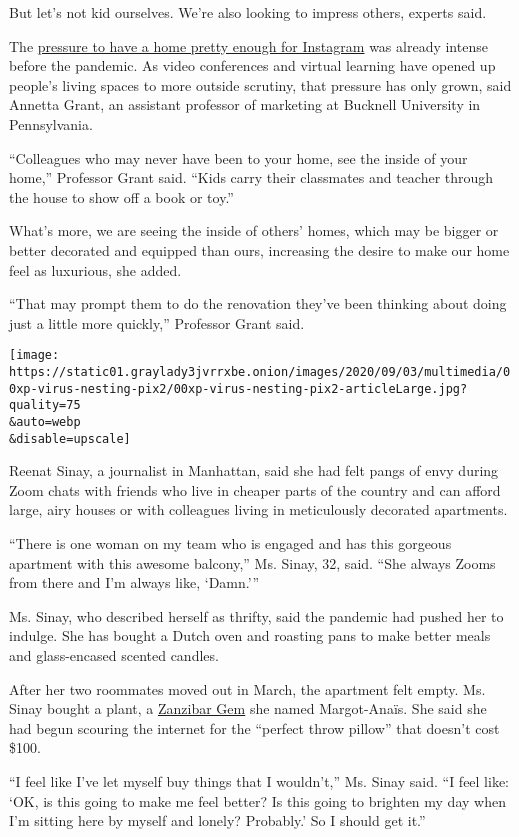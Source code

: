 But let's not kid ourselves. We're also looking to impress others,
experts said.

The
\href{https://www.idealhome.co.uk/news/how-instagram-makes-us-feel-about-homes-208263}{pressure
to have a home pretty enough for Instagram} was already intense before
the pandemic. As video conferences and virtual learning have opened up
people's living spaces to more outside scrutiny, that pressure has only
grown, said Annetta Grant, an assistant professor of marketing at
Bucknell University in Pennsylvania.

``Colleagues who may never have been to your home, see the inside of
your home,'' Professor Grant said. ``Kids carry their classmates and
teacher through the house to show off a book or toy.''

What's more, we are seeing the inside of others' homes, which may be
bigger or better decorated and equipped than ours, increasing the desire
to make our home feel as luxurious, she added.

``That may prompt them to do the renovation they've been thinking about
doing just a little more quickly,'' Professor Grant said.

\texttt{[image: https://static01.graylady3jvrrxbe.onion/images/2020/09/03/multimedia/00xp-virus-nesting-pix2/00xp-virus-nesting-pix2-articleLarge.jpg?quality=75\\\&auto=webp\\\&disable=upscale]}

Reenat Sinay, a journalist in Manhattan, said she had felt pangs of envy
during Zoom chats with friends who live in cheaper parts of the country
and can afford large, airy houses or with colleagues living in
meticulously decorated apartments.

``There is one woman on my team who is engaged and has this gorgeous
apartment with this awesome balcony,'' Ms. Sinay, 32, said. ``She always
Zooms from there and I'm always like, `Damn.'''

Ms. Sinay, who described herself as thrifty, said the pandemic had
pushed her to indulge. She has bought a Dutch oven and roasting pans to
make better meals and glass-encased scented candles.

After her two roommates moved out in March, the apartment felt empty.
Ms. Sinay bought a plant, a
\href{https://www.thespruce.com/zz-zanzibar-gem-plant-profile-4796783}{Zanzibar
Gem} she named Margot-Anaïs. She said she had begun scouring the
internet for the ``perfect throw pillow'' that doesn't cost \$100.

``I feel like I've let myself buy things that I wouldn't,'' Ms. Sinay
said. ``I feel like: `OK, is this going to make me feel better? Is this
going to brighten my day when I'm sitting here by myself and lonely?
Probably.' So I should get it.''

